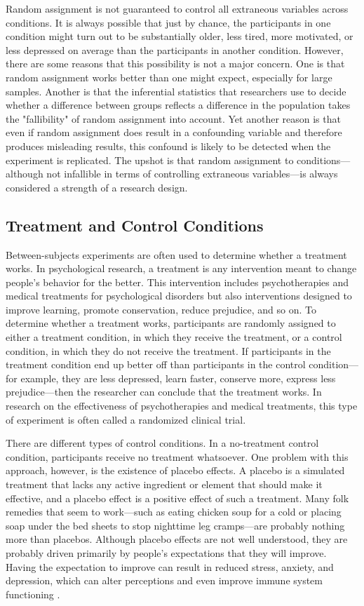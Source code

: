        
Random assignment is not guaranteed to control all extraneous variables across conditions. It is always possible that just by chance, the participants in one condition might turn out to be substantially older, less tired, more motivated, or less depressed on average than the participants in another condition. However, there are some reasons that this possibility is not a major concern. One is that random assignment works better than one might expect, especially for large samples. Another is that the inferential statistics that researchers use to decide whether a difference between groups reflects a difference in the population takes the "fallibility" of random assignment into account. Yet another reason is that even if random assignment does result in a confounding variable and therefore produces misleading results, this confound is likely to be detected when the experiment is replicated. The upshot is that random assignment to conditions---although not infallible in terms of controlling extraneous variables---is always considered a strength of a research design.

\subsection{Treatment and Control Conditions}

Between-subjects experiments are often used to determine whether a treatment works. In psychological research, a treatment is any intervention meant to change people's behavior for the better. This intervention includes psychotherapies and medical treatments for psychological disorders but also interventions designed to improve learning, promote conservation, reduce prejudice, and so on. To determine whether a treatment works, participants are randomly assigned to either a treatment condition, in which they receive the treatment, or a control condition, in which they do not receive the treatment. If participants in the treatment condition end up better off than participants in the control condition---for example, they are less depressed, learn faster, conserve more, express less prejudice---then the researcher can conclude that the treatment works. In research on the effectiveness of psychotherapies and medical treatments, this type of experiment is often called a randomized clinical trial.

There are different types of control conditions. In a no-treatment control condition, participants receive no treatment whatsoever. One problem with this approach, however, is the existence of placebo effects. A placebo is a simulated treatment that lacks any active ingredient or element that should make it effective, and a placebo effect is a positive effect of such a treatment. Many folk remedies that seem to work---such as eating chicken soup for a cold or placing soap under the bed sheets to stop nighttime leg cramps---are probably nothing more than placebos. Although placebo effects are not well understood, they are probably driven primarily by people's expectations that they will improve. Having the expectation to improve can result in reduced stress, anxiety, and depression, which can alter perceptions and even improve immune system functioning \citep{price_comprehensive_2008}.

